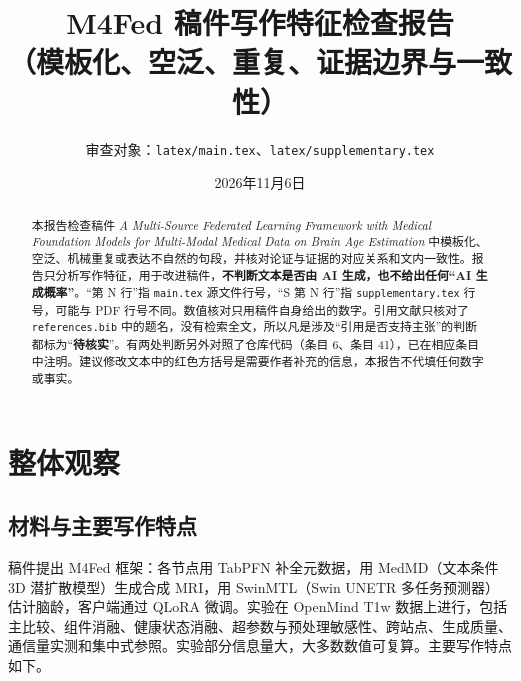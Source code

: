 \documentclass[11pt,a4paper]{ctexart}
\title{M4Fed 稿件写作特征检查报告\\[2pt]\large （模板化、空泛、重复、证据边界与一致性）}
\author{审查对象：\texttt{latex/main.tex}、\texttt{latex/supplementary.tex}}
\date{2026年11月6日}
\newcommand{\verify}{\textcolor{orange!80!black}{\textbf{待核实}}}
\begin{document}
\maketitle

\begin{abstract}
本报告检查稿件 \emph{A Multi-Source Federated Learning Framework with Medical Foundation Models for Multi-Modal Medical Data on Brain Age Estimation} 中模板化、空泛、机械重复或表达不自然的句段，并核对论证与证据的对应关系和文内一致性。报告只分析写作特征，用于改进稿件，\textbf{不判断文本是否由 AI 生成，也不给出任何“AI 生成概率”}。“第 N 行”指 \texttt{main.tex} 源文件行号，“S 第 N 行”指 \texttt{supplementary.tex} 行号，可能与 PDF 行号不同。数值核对只用稿件自身给出的数字。引用文献只核对了 \texttt{references.bib} 中的题名，没有检索全文，所以凡是涉及“引用是否支持主张”的判断都标为“\verify”。有两处判断另外对照了仓库代码（条目 6、条目 41），已在相应条目中注明。建议修改文本中的红色方括号是需要作者补充的信息，本报告不代填任何数字或事实。
\end{abstract}

\tableofcontents
\newpage

\section{整体观察}

\subsection{材料与主要写作特点}
稿件提出 M4Fed 框架：各节点用 TabPFN 补全元数据，用 MedMD（文本条件 3D 潜扩散模型）生成合成 MRI，用 SwinMTL（Swin UNETR 多任务预测器）估计脑龄，客户端通过 QLoRA 微调。实验在 OpenMind T1w 数据上进行，包括主比较、组件消融、健康状态消融、超参数与预处理敏感性、跨站点、生成质量、通信量实测和集中式参照。实验部分信息量大，大多数数值可复算。主要写作特点如下。
\end{document}
